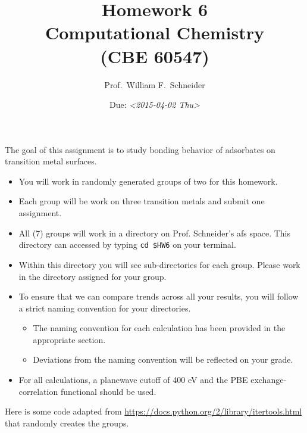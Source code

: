 \documentclass[11pt]{article}
\date{Due: \textit{<2015-04-02 Thu>}}
\title{}
\begin{document}
\title{Homework 6\\Computational Chemistry\\(CBE 60547)}
\author{Prof.\ William F.\ Schneider}
\maketitle

The goal of this assignment is to study bonding behavior of adsorbates on transition metal surfaces.

\begin{itemize}
\item You will work in randomly generated groups of two for this homework.

\item Each group will be work on three transition metals and submit one assignment.

\item All (7) groups will work in a directory on Prof. Schneider's afs space. This directory can accessed by typing \verb~cd $HW6~ on your terminal.

\item Within this directory you will see sub-directories for each group. Please work in the directory assigned for your group.

\item To ensure that we can compare trends across all your results, you will follow a strict naming convention for your directories. 
\begin{itemize}
\item The naming convention for each calculation has been provided in the appropriate section.
\item Deviations from the naming convention will be reflected on your grade.
\end{itemize}

\item For all calculations, a planewave cutoff of 400 eV and the PBE exchange-correlation functional should be used.
\end{itemize}

Here is some code adapted from \url{https://docs.python.org/2/library/itertools.html} that randomly creates the groups.
\end{document}
